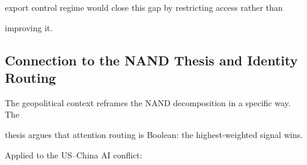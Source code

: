 export control regime would close this gap by restricting access rather than





improving it.











\subsection{Connection to the NAND Thesis and Identity Routing}











The geopolitical context reframes the NAND decomposition in a specific way. The





thesis argues that attention routing is Boolean: the highest-weighted signal wins.





Applied to the US--China AI conflict:











